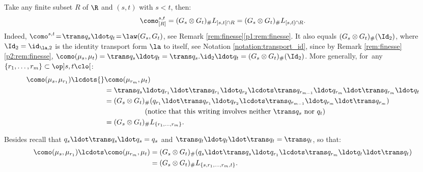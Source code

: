 \begin{rem}\label{rem:comp_mini} Take any finite subset $R$ of $\R$ and $(s,t)$ with $s<t$, then:
\[\como^{s,t}_{[R]}=(G_s\otimes G_t)_\#L_{]s,t[\cap R}=(G_s\otimes G_t)_\#L_{[s,t]\cap R}.\]
Indeed, $\como^{s,t}\!=\!\trans q_s\ldot q_t\!=\!\law(G_s,G_t)$, see Remark \ref{rem:finesse}\eqref{p1:rem:finesse}. It also equals $(G_s\otimes G_t)_\#(\Id_2)$, where $\Id_2=\id_{\la,2}$ is the identity transport form $\la$ to itself, see Notation \ref{notation:transport_id}, since by Remark \ref{rem:finesse}\eqref{p2:rem:finesse}, $\como(\mu_s,\mu_t)=\trans q_s \ldot q_t=\trans q_s. \id_2 \ldot q_t=(G_s\otimes G_t)_\#(\Id_2)$. More generally, for~any $\{r_1,\ldots,r_m\}\subset\op]s,t\clo[$:
\begin{align*}
\como(\mu_{s},\mu_{r_1})\lcdots{}& \como(\mu_{r_m},\mu_{t})\\
&=\trans q_{s}{}\ldot q_{r_1}{}\ldot\trans q_{r_1}{}\ldot q_{r_2}\lcdots \trans q_{r_{m-1}}{}\ldot q_{r_{m}}{}\ldot\trans q_{r_{m}}{}\ldot q_{t}\\
&=(G_{s}\otimes G_{t})_\#(q_{r_1}{}\ldot\trans q_{r_1}{}\ldot q_{r_2}\lcdots \trans q_{r_{m-1}}{}\ldot q_{r_{m}}{}\ldot\trans q_{r_{m}})\\
&\hspace*{2cm}\text{(notice that this writing involves neither $\trans q_{s}$ nor $q_{t}$)}\\
&=(G_{s}\otimes G_t)_\#L_{\{r_1,\ldots,r_m\}}.
\end{align*}

Besides recall that $q_s\ldot\trans q_s\ldot q_s=q_s$ and $\trans q_t\ldot q_t\ldot\trans q_t=\trans q_t$, so that:
\begin{align*}
\como(\mu_{s},\mu_{r_1})\lcdots \como(\mu_{r_m},\mu_{t})
&=(G_{s}\otimes G_{t})_\#(q_{s}{}\ldot\trans q_{s}{}\ldot q_{r_1}\lcdots \trans q_{r_m}{}\ldot q_{t}{}\ldot\trans q_{t})\\
&=(G_{s}\otimes G_t)_\#L_{\{s,r_1,\ldots,r_m,t\}}.
\end{align*}
\end{rem}

